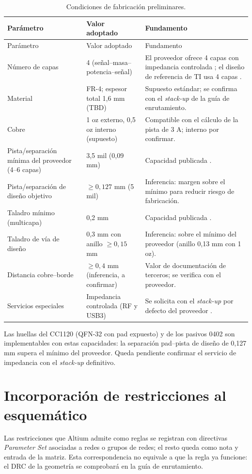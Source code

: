 \documentclass[11pt,letterpaper]{article}
\begin{document}
\begin{longtable}{L{4cm}L{4.4cm}L{6.8cm}}
\caption{Condiciones de fabricación preliminares.}\label{tab:fab}\\
\toprule Parámetro & Valor adoptado & Fundamento \\
\midrule\endfirsthead
\toprule Parámetro & Valor adoptado & Fundamento \\
\midrule\endhead
Número de capas & 4 (señal--masa--potencia--señal) & El proveedor ofrece 4 capas con impedancia controlada \cite{jlcpcb}; el diseño de referencia de TI usa 4 capas \cite{cc1120em}. \\
Material & FR-4; espesor total 1,6 mm (TBD) & Supuesto estándar; se confirma con el \emph{stack-up} de la guía de enrutamiento. \\
Cobre & 1 oz externo, 0,5 oz interno (supuesto) & Compatible con el cálculo de la pista de 3 A; interno por confirmar. \\
Pista/separación mínima del proveedor (4--6 capas) & 3,5 mil (0,09 mm) & Capacidad publicada \cite{jlcpcb}. \\
Pista/separación de diseño objetivo & $\geq0{,}127$ mm (5 mil) & Inferencia: margen sobre el mínimo para reducir riesgo de fabricación. \\
Taladro mínimo (multicapa) & 0,2 mm & Capacidad publicada \cite{jlcpcb}. \\
Taladro de vía de diseño & 0,3 mm con anillo $\geq0{,}15$ mm & Inferencia: sobre el mínimo del proveedor (anillo 0,13 mm con 1 oz). \\
Distancia cobre--borde & $\geq0{,}4$ mm (inferencia, a confirmar) & Valor de documentación de terceros; se verifica con el proveedor. \\
Servicios especiales & Impedancia controlada (RF y USB3) & Se solicita con el \emph{stack-up} por defecto del proveedor \cite{jlcpcb}. \\
\bottomrule
\end{longtable}
Las huellas del CC1120 (QFN-32 con pad expuesto) y de los pasivos 0402 son implementables con estas capacidades: la separación pad--pista de diseño de 0,127 mm supera el mínimo del proveedor. Queda pendiente confirmar el servicio de impedancia con el \emph{stack-up} definitivo.

\section{Incorporación de restricciones al esquemático}
\label{sec:ps}
Las restricciones que Altium admite como reglas se registran con directivas \emph{Parameter Set} asociadas a redes o grupos de redes; el resto queda como nota y entrada de la matriz. Esta correspondencia no equivale a que la regla ya funcione: el DRC de la geometría se comprobará en la guía de enrutamiento.
\end{document}
